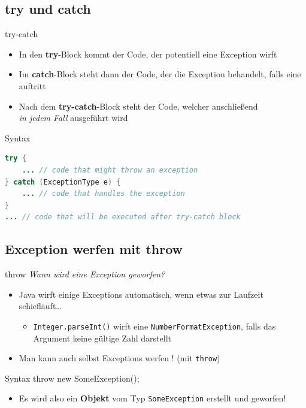 \documentclass[18pt]{beamer}
\begin{document}
\subsection{try und catch}


\begin{frame}[fragile]{try-catch}
    \begin{itemize}
        \item In den \textbf{try}-Block kommt der Code, der potentiell eine Exception wirft
        \item Im \textbf{catch}-Block steht dann der Code, der die Exception behandelt, falls eine auftritt
        \item Nach dem \textbf{try-catch}-Block steht der Code, welcher anschließend \\
        \textit{in jedem Fall} ausgeführt wird
    \end{itemize}

    \begin{exampleblock}{Syntax}
        \begin{lstlisting}[language=Java,basicstyle=\scriptsize]
try {
    ... // code that might throw an exception
} catch (ExceptionType e) {
    ... // code that handles the exception
}
... // code that will be executed after try-catch block
        \end{lstlisting}

    \end{exampleblock}
\end{frame}

\subsection{Exception werfen mit throw}


\begin{frame}[fragile]{throw}
    \textit{Wann wird eine Exception geworfen?}
    \begin{itemize}
        \item Java wirft einige Exceptions automatisch, wenn etwas zur Laufzeit schiefläuft\dots
        \begin{itemize}
            \item \texttt{Integer.parseInt()} wirft eine \texttt{NumberFormatException}, falls das Argument keine gültige Zahl darstellt
        \end{itemize}
        \item Man kann auch selbst Exceptions werfen ! (mit \texttt{throw})
    \end{itemize}

    \begin{exampleblock}{Syntax}
throw new SomeException();
    \end{exampleblock}

    \begin{itemize}
        \item Es wird also ein \textbf{Objekt} vom Typ \texttt{SomeException} erstellt und geworfen!
    \end{itemize}

\end{frame}
\end{document}
